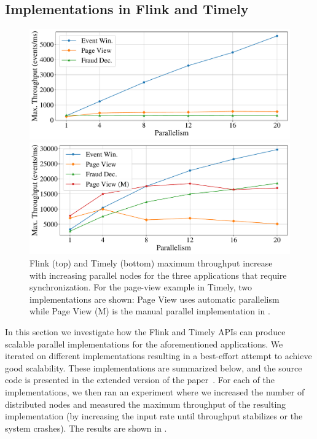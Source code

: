 \subsection{Implementations in Flink and Timely}
\label{dgs:ssec:eval-existing-implementations}

\begin{figure}[t]
  \centering
  \includegraphics[width=0.8\columnwidth]{figures/dgs/flink_max_throughput_scaleup}

  \includegraphics[width=0.8\columnwidth]{figures/dgs/timely_max_throughput_scaleup}
  \caption[Flink and Timely throughput experiments.]{
  Flink (top) and Timely (bottom) maximum throughput increase with increasing parallel nodes for the three applications that require synchronization.
  For the page-view example in Timely, two implementations are shown: Page View uses automatic
  parallelism while Page View (M) is the manual parallel implementation
  in .
  }
  \label{dgs:fig:existing-implementations-scaling}
\end{figure}

In this section we investigate how the Flink and Timely APIs can produce scalable parallel implementations for the aforementioned applications.
We iterated on different implementations resulting in a best-effort attempt to achieve good scalability. These implementations are summarized below, and the source code is presented in the extended version of the paper~.
For each of the implementations, we then ran an experiment where we increased the number of distributed nodes and measured the maximum throughput of the resulting implementation (by increasing the input rate until throughput stabilizes or the system crashes).
The results are shown in .

